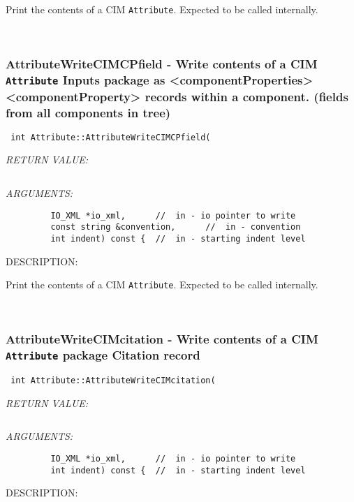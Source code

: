       Print the contents of a CIM {\tt Attribute}.  Expected to be
      called internally.
   
 
\mbox{}\hrulefill\
 
\subsubsection [AttributeWriteCIMCPfield] {AttributeWriteCIMCPfield - Write contents of a CIM {\tt Attribute} Inputs package as <componentProperties><componentProperty> records within a component. (fields from all components in tree)}


  
\begin{verbatim} int Attribute::AttributeWriteCIMCPfield(\end{verbatim}{\em RETURN VALUE:}
\begin{verbatim} \end{verbatim}{\em ARGUMENTS:}
\begin{verbatim}         IO_XML *io_xml,      //  in - io pointer to write
         const string &convention,      //  in - convention
         int indent) const {  //  in - starting indent level\end{verbatim}
{\sf DESCRIPTION:\\ }


      Print the contents of a CIM {\tt Attribute}.  Expected to be
      called internally.
   
 
\mbox{}\hrulefill\
 
\subsubsection [AttributeWriteCIMcitation] {AttributeWriteCIMcitation - Write contents of a CIM {\tt Attribute} package Citation record}


  
\begin{verbatim} int Attribute::AttributeWriteCIMcitation(\end{verbatim}{\em RETURN VALUE:}
\begin{verbatim} \end{verbatim}{\em ARGUMENTS:}
\begin{verbatim}         IO_XML *io_xml,      //  in - io pointer to write
         int indent) const {  //  in - starting indent level\end{verbatim}
{\sf DESCRIPTION:\\ }


